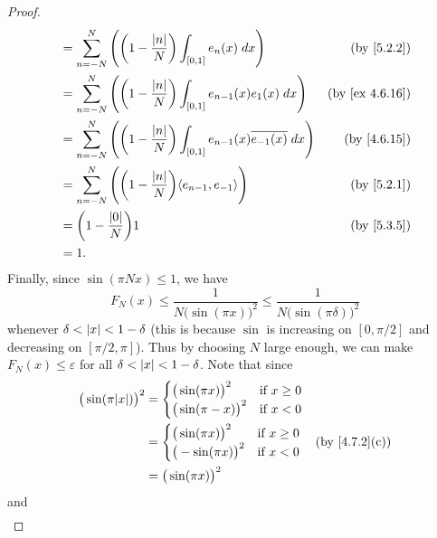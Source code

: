 \begin{proof}
\begin{align*}
     & = \sum_{n = -N}^N \Bigg(\bigg(1 - \frac{\abs{n}}{N}\bigg) \int_{[0, 1]} e_n(x) \; dx\Bigg)                            & \text{(by \cref{5.2.2})}     \\
     & = \sum_{n = -N}^N \Bigg(\bigg(1 - \frac{\abs{n}}{N}\bigg) \int_{[0, 1]} e_{n - 1}(x) e_1(x) \; dx\Bigg)               & \text{(by \cref{ex 4.6.16})} \\
     & = \sum_{n = -N}^N \Bigg(\bigg(1 - \frac{\abs{n}}{N}\bigg) \int_{[0, 1]} e_{n - 1}(x) \overline{e_{-1}(x)} \; dx\Bigg) & \text{(by \cref{4.6.15})}    \\
     & = \sum_{n = -N}^N \Bigg(\bigg(1 - \frac{\abs{n}}{N}\bigg) \inner*{e_{n - 1}, e_{-1}}\Bigg)                            & \text{(by \cref{5.2.1})}     \\
     & = \bigg(1 - \frac{\abs{0}}{N}\bigg) 1                                                                                 & \text{(by \cref{5.3.5})}     \\
     & = 1.
  \end{align*}
  Finally, since \(\sin(\pi N x) \leq 1\), we have
  \[
    F_N(x) \leq \frac{1}{N \big(\sin(\pi x)\big)^2} \leq \frac{1}{N \big(\sin(\pi \delta)\big)^2}
  \]
  whenever \(\delta < \left\lvert x\right\rvert < 1 - \delta\)
  (this is because \(\sin\) is increasing on \([0, \pi / 2]\) and decreasing on \([\pi / 2, \pi]\)).
  Thus by choosing \(N\) large enough, we can make \(F_N (x) \leq \varepsilon\) for all \(\delta < \left\lvert x\right\rvert < 1 - \delta\).
  Note that since
  \begin{align*}
    \big(\sin(\pi \abs{x})\big)^2 & = \begin{cases}
                                        \big(\sin(\pi x)\big)^2  & \text{if } x \geq 0 \\
                                        \big(\sin(\pi -x)\big)^2 & \text{if } x < 0
                                      \end{cases} \\
                                  & = \begin{cases}
                                        \big(\sin(\pi x)\big)^2  & \text{if } x \geq 0 \\
                                        \big(-\sin(\pi x)\big)^2 & \text{if } x < 0
                                      \end{cases} & \text{(by \cref{4.7.2}(c))} \\
                                  & = \big(\sin(\pi x)\big)^2
  \end{align*}
  and
  \begin{align*}

\end{align*}
\end{proof}

